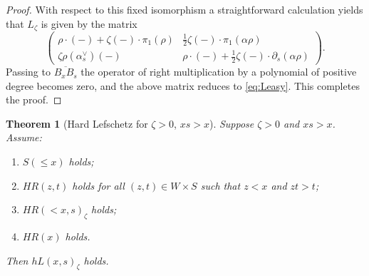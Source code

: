 \documentclass[11pt]{amsart}
\numberwithin{equation}{section}
\def\a{\alpha}
\def\g{\gamma}
\def\z{\zeta}
\def\ov{\overline}
\def\un{\underline}
\newtheorem{thm}{Theorem}[section]
\theoremstyle{definition}
\theoremstyle{remark}
\begin{document}
{\begin{proof}
With respect to this fixed isomorphism a straightforward calculation yields
that $L_\z$ is given by the matrix
\[
\left (
\begin{matrix}
\rho \cdot (- ) + \z(-) \cdot \pi_1(\rho)  & \frac{1}{2} \z (-) \cdot 
\pi_1(\alpha\rho) \\
\z\rho(\a_s^\vee)(-) & \rho \cdot (- ) + \frac{1}{2} \z (-)
\cdot \partial_s(\a \rho)
\end{matrix}
\right ) .
\]
Passing to $\overline{B_xB_s}$ the operator of right multiplication by
a polynomial of positive degree becomes zero, and the above matrix
reduces to \eqref{eq:Leasy}. This completes the proof.
\end{proof}

\begin{thm}[Hard Lefschetz for $\z > 0$, $xs > x$]
\label{thm:hLII} Suppose $\z > 0$ and $xs > x$. Assume:
\begin{enumerate}
\item $S(\le\!x)$ holds;
\item $HR(z,t)$ holds for all $(z,t) \in W \times S$ such that $z < x$
  and $zt > t$;
\item $HR(<\!x,s)_\z$ holds;
\item $HR(x)$ holds.
\end{enumerate}
Then $hL(x,s)_\z$ holds.
\end{thm}


}
\end{document}
